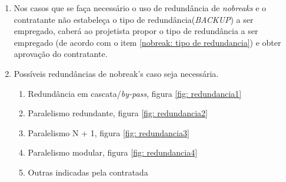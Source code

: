 \begin{enumerate}
	\item Nos casos que se faça necessário o uso de redundância de \textit{nobreaks} e o contratante não estabeleça o tipo de redundância(\textit{BACKUP}) a ser empregado, caberá ao projetista propor o tipo de redundância a ser empregado (de acordo com o item \ref{nobreak: tipo de redundancia}) e obter aprovação do contratante.
	
	\item Possíveis redundâncias de nobreak's caso seja necessária.
	\begin{enumerate}\label{nobreak: tipo de redundancia}
		\item Redundância em cascata/\textit{by-pass}, figura \ref{fig: redundancia1}
		
		\item Paralelismo redundante, figura  \ref{fig: redundancia2}
		
		\item Paralelismo N + 1, figura  \ref{fig: redundancia3}
		
		\item Paralelismo modular, figura  \ref{fig: redundancia4}
		
		\item Outras indicadas pela contratada
		
	\end{enumerate}


\end{enumerate}
